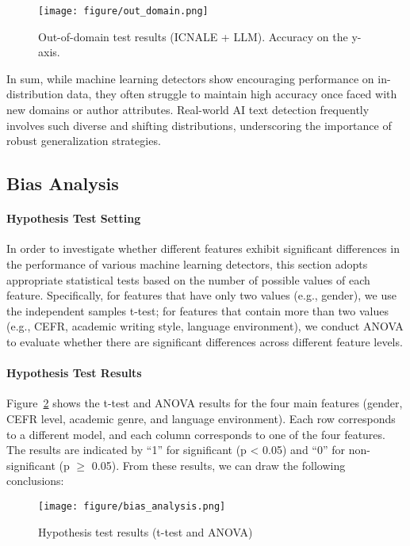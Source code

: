 \begin{figure}[!t]
    \centering
    \texttt{[image: figure/out\_domain.png]}
    \caption{Out-of-domain test results (ICNALE + LLM). Accuracy on the y-axis.}
    \label{fig:out_domain}
\end{figure}

In sum, while machine learning detectors show encouraging performance on in-distribution data, they often struggle to maintain high accuracy once faced with new domains or author attributes. Real-world AI text detection frequently involves such diverse and shifting distributions, underscoring the importance of robust generalization strategies.

\subsection{Bias Analysis}
\paragraph{Hypothesis Test Setting}
In order to investigate whether different features exhibit significant differences in the performance of various machine learning detectors, this section adopts appropriate statistical tests based on the number of possible values of each feature. Specifically, for features that have only two values (e.g., gender), we use the independent samples t-test; for features that contain more than two values (e.g., CEFR, academic writing style, language environment), we conduct ANOVA to evaluate whether there are significant differences across different feature levels.

\paragraph{Hypothesis Test Results}
Figure~\ref{fig:hypothesis_test_results} shows the t-test and ANOVA results for the four main features (gender, CEFR level, academic genre, and language environment). Each row corresponds to a different model, and each column corresponds to one of the four features. The results are indicated by ``1'' for significant (p < 0.05) and ``0'' for non-significant (p \(\ge\) 0.05). From these results, we can draw the following conclusions:

\begin{figure}[!t]
    \centering
    \texttt{[image: figure/bias\_analysis.png]}
    \caption{Hypothesis test results (t-test and ANOVA)}
    \label{fig:hypothesis_test_results}
\end{figure}

